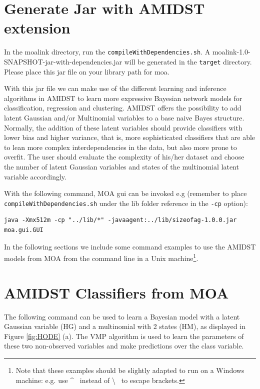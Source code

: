 \section{Generate Jar with AMIDST extension}
In the moalink directory, run the \texttt{compileWithDependencies.sh}. A moalink-1.0-SNAPSHOT-jar-with-dependencies.jar will be generated in the \texttt{target} directory. Please place this jar file on your library path for moa. 

With this jar file we can make use of the different learning and inference algorithms in AMIDST to learn more expressive Bayesian network models for classification, regression and clustering. AMIDST offers the possibility to add latent Gaussian and/or Multinomial variables to a base naive Bayes structure. Normally, the addition of these latent variables should provide classifiers with lower bias and higher variance, that is, more sophisticated classifiers that are able to lean more complex interdependencies in the data, but also more prone to overfit. The user should evaluate the complexity of his/her dataset and choose the number of latent Gaussian variables and states of the multinomial latent variable accordingly.

With the following command, MOA gui can be invoked e.g (remember to place \texttt{compileWithDependencies.sh} under the lib folder reference in the \verb'-cp' option):

\begin{verbatim}
java -Xmx512m -cp "../lib/*" -javaagent:../lib/sizeofag-1.0.0.jar
moa.gui.GUI
\end{verbatim}

In the following sections we include some command examples to use the AMIDST models from MOA from the command line in a Unix machine\footnote{Note that these examples should be slightly adapted to run on a Windows machine: e.g. use \textasciicircum~ instead of \textbackslash~ to escape brackets.}.

\section{AMIDST Classifiers from MOA}

The following command can be used to learn a Bayesian model with a latent Gaussian variable (HG) and a multinomial with 2 states (HM), as displayed in Figure \ref{fig:HODE} (a). The VMP algorithm is used to learn the parameters of these two non-observed variables and make predictions over the class variable.

